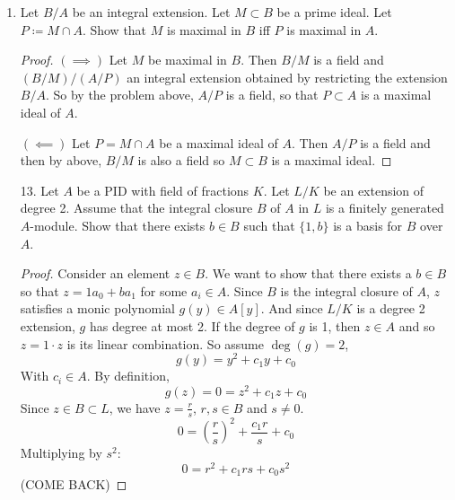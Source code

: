 \documentclass[hidelinks,12pt]{article}
\begin{document}
\begin{enumerate}
\begin{proof}
            \par\null\par
            \((\impliedby)\) Let \(B/A\) be an integral extension and \(A\) a field. Then \(B/A\) is a field extension, and so \(B\) is a field.
        \end{proof}
    \item Let \(B/A\) be an integral extension. Let \(M\subset B\) be a prime ideal. Let \(P\coloneqq M\cap A\). Show that \(M\) is maximal in \(B\) iff \(P\) is maximal in \(A\).
        \begin{proof}
            \((\implies)\) Let \(M\) be maximal in \(B\). Then \(B/M\) is a field and \((B/M)/(A/P)\) an integral extension obtained by restricting the extension \(B/A\). So by the problem above, \(A/P\) is a field, so that \(P\subset A\) is a maximal ideal of \(A\).\par\null\par
            \((\impliedby)\) Let \(P=M\cap A\) be a maximal ideal of \(A\). Then \(A/P\) is a field and then by above, \(B/M\) is also a field so \(M\subset B\) is a maximal ideal.
        \end{proof}
    \item[13.] Let \(A\) be a PID with field of fractions \(K\). Let \(L/K\) be an extension of degree 2. Assume that the integral closure \(B\) of \(A\) in \(L\) is a finitely generated \(A\)-module. Show that there exists \(b\in B\) such that \(\{1,b\}\) is a basis for \(B\) over \(A\).
        \begin{proof}
            Consider an element \(z\in B\). We want to show that there exists a \(b\in B\) so that \(z=1a_{0}+ba_{1}\) for some \(a_{i}\in A\). Since \(B\) is the integral closure of \(A\), \(z\) satisfies a monic polynomial \(g(y)\in A[y]\). And since \(L/K\) is a degree 2 extension, \(g\) has degree at most 2. If the degree of \(g\) is 1, then \(z\in A\) and so \(z=1\cdot z\) is its linear combination. So assume \(\deg(g)=2\),
            \[
                g(y)=y^{2}+c_{1}y+c_{0}
            \]
            With \(c_{i}\in A\). By definition, \[
                g(z)=0=z^{2}+c_{1}z+c_{0}
            \]
            Since \(z\in B\subset L\), we have \(z=\frac{r}{s}\), \(r,s\in B\) and \(s\neq 0\). \[
                0=\left(\frac{r}{s}\right)^{2}+\frac{c_{1}r}{s}+c_{0}
            \]
            Multiplying by \(s^{2}\):
            \[
                0=r^{2}+c_{1}rs+c_{0}s^{2}
            \]
            (COME BACK)
        \end{proof}
\end{enumerate}
\end{document}

